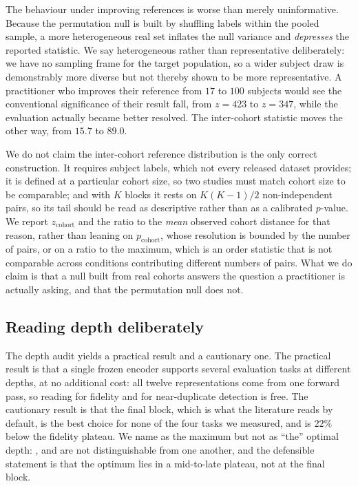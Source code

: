 The behaviour under improving references is worse than merely uninformative.
Because the permutation null is built by shuffling labels within the pooled
sample, a more heterogeneous real set inflates the null variance and
\emph{depresses} the reported statistic. We say heterogeneous rather than
representative deliberately: we have no sampling frame for the target
population, so a wider subject draw is demonstrably more diverse but not
thereby shown to be more representative. A
practitioner who improves their reference from $17$ to $100$ subjects would see
the conventional significance of their result fall, from $z = 423$ to $z = 347$,
while the evaluation actually became better resolved. The inter-cohort
statistic moves the other way, from $15.7$ to $89.0$.

We do not claim the inter-cohort reference distribution is the only correct construction. It requires
subject labels, which not every released dataset provides; it is defined at a
particular cohort size, so two studies must match cohort size to be comparable;
and with $K$ blocks it rests on $K(K-1)/2$ non-independent pairs, so its tail
should be read as descriptive rather than as a calibrated $p$-value. We report
$z_{\mathrm{cohort}}$ and the ratio to the \emph{mean} observed cohort distance
for that reason, rather than leaning on $p_{\mathrm{cohort}}$, whose resolution
is bounded by the number of pairs, or on a ratio to the maximum, which is an
order statistic that is not comparable across conditions contributing different
numbers of pairs. What we do claim is that a null built from real
cohorts answers the question a practitioner is actually asking, and that the
permutation null does not.

\subsection{Reading depth deliberately}

The depth audit yields a practical result and a cautionary one. The practical
result is that a single frozen encoder supports several evaluation tasks at
different depths, at no additional cost: all twelve representations come from
one forward pass, so reading  for fidelity and  for near-duplicate
detection is free. The cautionary result is that the final block, which is what
the literature reads by default, is the best choice for none of the four tasks
we measured, and is $22\%$ below the fidelity plateau. We name  as the
maximum but not as ``the'' optimal depth: ,  and  are not
distinguishable from one another, and the defensible statement is that the
optimum lies in a mid-to-late plateau, not at the final block.

